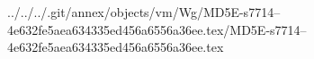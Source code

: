../../../.git/annex/objects/vm/Wg/MD5E-s7714--4e632fe5aea634335ed456a6556a36ee.tex/MD5E-s7714--4e632fe5aea634335ed456a6556a36ee.tex
